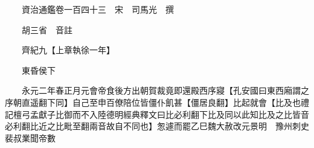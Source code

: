 










 


 
 


 

  
  
  
  
  





  
  
  
  
  
 
  

  

  
  
  



  

 
 

  
   




  

  
  


  　　資治通鑑卷一百四十三　宋　司馬光　撰

　　胡三省　音註

　　齊紀九【上章執徐一年】

　　東昏侯下

　　永元二年春正月元會帝食後方出朝賀裁竟即還殿西序寢【孔安國曰東西廂謂之序朝直遥翻下同】自己至申百僚陪位皆僵仆飢甚【僵居良翻】比起就會【比及也禮記檀弓孟獻子比御而不入陸德明經典釋文曰比必利翻下比及同以此知比及之比皆音必利翻比近之比毗至翻兩音故自不同也】怱遽而罷乙巳魏大赦改元景明　豫州刺史裴叔業聞帝數

